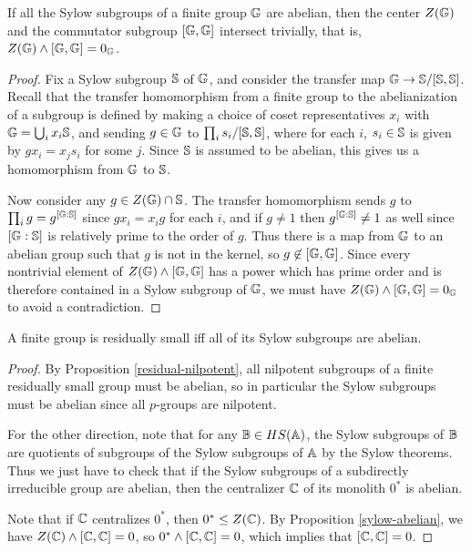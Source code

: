 \begin{appendices}
\begin{prop}\label{sylow-abelian} If all the Sylow subgroups of a finite group $\mathbb{G}$ are abelian, then the center $Z(\mathbb{G})$ and the commutator subgroup $[\mathbb{G},\mathbb{G}]$ intersect trivially, that is, $Z(\mathbb{G}) \wedge [\mathbb{G},\mathbb{G}] = 0_{\mathbb{G}}$.
\end{prop}
\begin{proof} Fix a Sylow subgroup $\mathbb{S}$ of $\mathbb{G}$, and consider the transfer map $\mathbb{G} \rightarrow \mathbb{S}/[\mathbb{S},\mathbb{S}]$. Recall that the transfer homomorphism from a finite group to the abelianization of a subgroup is defined by making a choice of coset representatives $x_i$ with $\mathbb{G} = \bigcup_i x_i\mathbb{S}$, and sending $g \in \mathbb{G}$ to $\prod_i s_i/[\mathbb{S},\mathbb{S}]$, where for each $i$, $s_i \in \mathbb{S}$ is given by $gx_i = x_js_i$ for some $j$. Since $\mathbb{S}$ is assumed to be abelian, this gives us a homomorphism from $\mathbb{G}$ to $\mathbb{S}$.

Now consider any $g \in Z(\mathbb{G}) \cap \mathbb{S}$. The transfer homomorphism sends $g$ to $\prod_i g = g^{[\mathbb{G}:\mathbb{S}]}$ since $gx_i = x_ig$ for each $i$, and if $g \ne 1$ then $g^{[\mathbb{G}:\mathbb{S}]} \ne 1$ as well since $[\mathbb{G}:\mathbb{S}]$ is relatively prime to the order of $g$. Thus there is a map from $\mathbb{G}$ to an abelian group such that $g$ is not in the kernel, so $g \not\in [\mathbb{G},\mathbb{G}]$. Since every nontrivial element of $Z(\mathbb{G}) \wedge [\mathbb{G},\mathbb{G}]$ has a power which has prime order and is therefore contained in a Sylow subgroup of $\mathbb{G}$, we must have $Z(\mathbb{G}) \wedge [\mathbb{G},\mathbb{G}] = 0_{\mathbb{G}}$ to avoid a contradiction.
\end{proof}

\begin{cor} A finite group is residually small iff all of its Sylow subgroups are abelian.
\end{cor}
\begin{proof} By Proposition \ref{residual-nilpotent}, all nilpotent subgroups of a finite residually small group must be abelian, so in particular the Sylow subgroups must be abelian since all $p$-groups are nilpotent.

For the other direction, note that for any $\mathbb{B} \in HS(\mathbb{A})$, the Sylow subgroups of $\mathbb{B}$ are quotients of subgroups of the Sylow subgroups of $\mathbb{A}$ by the Sylow theorems. Thus we just have to check that if the Sylow subgroups of a subdirectly irreducible group are abelian, then the centralizer $\mathbb{C}$ of its  monolith $0^*$ is abelian.

Note that if $\mathbb{C}$ centralizes $0^*$, then $0^* \le Z(\mathbb{C})$. By Proposition \ref{sylow-abelian}, we have $Z(\mathbb{C}) \wedge [\mathbb{C},\mathbb{C}] = 0$, so $0^* \wedge [\mathbb{C},\mathbb{C}] = 0$, which implies that $[\mathbb{C},\mathbb{C}] = 0$.
\end{proof}


\end{appendices}
